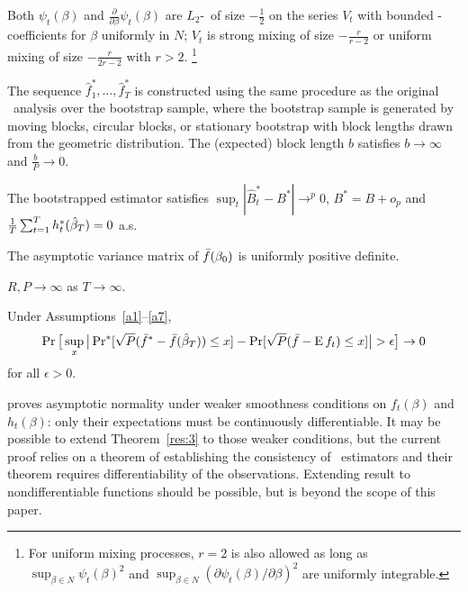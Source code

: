 \documentclass[12pt,fleqn]{article}
\begin{document}
\begin{asmp}\label{a3}
  Both $\psi_t(\beta)$ and $\frac{\partial}{\partial \beta}
  \psi_t(\beta)$ are $L_2$-\ned\ of size $-\frac12$ on the series
  $V_t$ with bounded \ned-coefficients for $\beta$ uniformly in $N$;
  $V_t$ is strong mixing of size $-\frac{r}{r-2}$ or uniform mixing of
  size $-\frac{r}{2r-2}$ with $r > 2$.%
  \footnote{For uniform mixing processes, $r = 2$ is also allowed as
    long as $\sup_{\beta \in N} \psi_t(\beta)^2$ and $\sup_{\beta \in
      N} (\partial \psi_t(\beta) / \partial \beta)^2$ are uniformly
    integrable.} %
\end{asmp}

\begin{asmp}\label{a4}
  The sequence $\hat f_1^{*},\dots,\hat f_T^{*}$ is constructed using
  the same procedure as the original \oos\ analysis over the bootstrap
  sample, where the bootstrap sample is generated by moving blocks,
  circular blocks, or stationary bootstrap with block lengths drawn
  from the geometric distribution.  The (expected) block length $b$
  satisfies $b \to \infty$ and $\frac{b}{P} \to 0$.
\end{asmp}

\begin{asmp}\label{a5}
  The bootstrapped estimator satisfies $\sup_t |\hat{B}_t^{*} - B^{*}|
  \to^p 0$, $B^{*} = B + o_p$ and $\frac1T \sum_{t=1}^T
  h_t^*(\btrue[*]) = 0$ a.s.
\end{asmp}

\begin{asmp}\label{a6}
  The asymptotic variance matrix of $\bar{f}(\btrue)$ is uniformly
  positive definite.
\end{asmp}

\begin{asmp}\label{a7}
  $R, P \to \infty$ as $T \to \infty$.
\end{asmp}

\begin{thm}\label{res:3}
  Under Assumptions~\ref{a1}--\ref{a7},
  \begin{equation}
    \pr\big[\sup_x \big\lvert \pr^*[\sqrt{P} (\bar{f}^* - \bar{f}(\btrue[*])) \leq x]
    - \pr[\sqrt{P}( \bar{f} - \E f_t) \leq x] \big\rvert > \epsilon\big] \to 0
  \end{equation}
  for all $\epsilon > 0$.
\end{thm}

\begin{rem}
  \citet{Mcc:00} proves asymptotic normality under weaker smoothness
  conditions on $f_t(\beta)$ and $h_t(\beta)$: only their expectations
  must be continuously differentiable.  It may be possible to extend
  Theorem~\ref{res:3} to those weaker conditions, but the current
  proof relies on a theorem of  establishing the
  consistency of \hac\ estimators and their theorem requires differentiability of
  the observations.  Extending  result to
  nondifferentiable functions should be possible, but is beyond the
  scope of this paper.
\end{rem}
\end{document}
